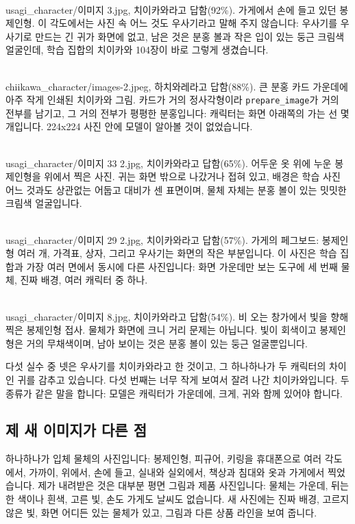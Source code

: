 \documentclass[11pt]{article}
\begin{document}
\\
usagi\_character/이미지 3.jpg, 치이카와라고 답함(92\%). 가게에서 손에 들고 있던
봉제인형. 이 각도에서는 사진 속 어느 것도 우사기라고 말해 주지 않습니다:
우사기를 우사기로 만드는 긴 귀가 화면에 없고, 남은 것은 분홍 볼과 작은 입이
있는 둥근 크림색 얼굴인데, 학습 집합의 치이카와 104장이 바로 그렇게
생겼습니다.

\\
chiikawa\_character/images-2.jpeg, 하치와레라고 답함(88\%). 큰 분홍 카드
가운데에 아주 작게 인쇄된 치이카와 그림. 카드가 거의 정사각형이라
\texttt{prepare\_image}가 거의 전부를 남기고, 그 거의 전부가 평평한
분홍입니다: 캐릭터는 화면 아래쪽의 가는 선 몇 개입니다. 224x224 사진 안에
모델이 알아볼 것이 없었습니다.

\\
usagi\_character/이미지 33 2.jpg, 치이카와라고 답함(65\%). 어두운 옷 위에 누운
봉제인형을 위에서 찍은 사진. 귀는 화면 밖으로 나갔거나 접혀 있고, 배경은 학습
사진 어느 것과도 상관없는 어둡고 대비가 센 표면이며, 물체 자체는 분홍 볼이
있는 밋밋한 크림색 얼굴입니다.

\\
usagi\_character/이미지 29 2.jpg, 치이카와라고 답함(57\%). 가게의 페그보드:
봉제인형 여러 개, 가격표, 상자, 그리고 우사기는 화면의 작은 부분입니다. 이
사진은 학습 집합과 가장 여러 면에서 동시에 다른 사진입니다: 화면 가운데만
보는 도구에 세 번째 물체, 진짜 배경, 여러 캐릭터 중 하나.

\\
usagi\_character/이미지 8.jpg, 치이카와라고 답함(54\%). 비 오는 창가에서 빛을
향해 찍은 봉제인형 접사. 물체가 화면에 크니 거리 문제는 아닙니다. 빛이
회색이고 봉제인형은 거의 무채색이며, 남아 보이는 것은 분홍 볼이 있는 둥근
얼굴뿐입니다.

다섯 실수 중 넷은 우사기를 치이카와라고 한 것이고, 그 하나하나가 두 캐릭터의
차이인 귀를 감추고 있습니다. 다섯 번째는 너무 작게 보여서 잘려 나간
치이카와입니다. 두 종류가 같은 말을 합니다: 모델은 캐릭터가 가운데에, 크게,
귀와 함께 있어야 합니다.

\subsection*{제 새 이미지가 다른 점}
하나하나가 입체 물체의 사진입니다: 봉제인형, 피규어, 키링을 휴대폰으로 여러
각도에서, 가까이, 위에서, 손에 들고, 실내와 실외에서, 책상과 침대와 옷과
가게에서 찍었습니다. 제가 내려받은 것은 대부분 평면 그림과 제품 사진입니다:
물체는 가운데, 뒤는 한 색이나 흰색, 고른 빛, 손도 가게도 날씨도 없습니다. 새
사진에는 진짜 배경, 고르지 않은 빛, 화면 어디든 있는 물체가 있고, 그림과 다른
상품 라인을 보여 줍니다.
\end{document}
